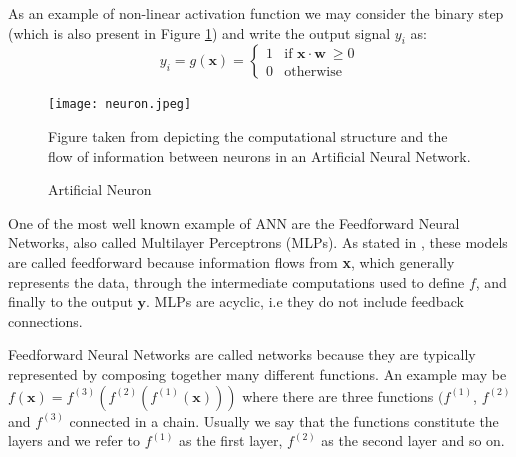 As an example of non-linear activation function we may consider the binary step (which is also present in Figure \ref{fig:neuron}) and write the output signal \(y_i\) as: 
\begin{equation}
  y_i = g(\textbf{x}) =
    \begin{cases}
      1 
      & \text{if } \textbf{x}
      \cdot
      \textbf{w}
       \: \geq 0 \\
      0 
      & \text{otherwise}
    \end{cases}
\end{equation}

\begin{figure}[htp] 
\centering
\texttt{[image: neuron.jpeg]}
\caption{Artificial Neuron}
Figure taken from \cite{neuron} depicting the computational structure and the flow of information between neurons in an Artificial Neural Network.
\label{fig:neuron}
\end{figure}

One of the most well known example of ANN are the Feedforward Neural Networks, also called Multilayer Perceptrons (MLPs). As stated in \cite{Goodfellow-et-al-2016}, these models are called feedforward because information flows from \textbf{x}, which generally represents the data, through the intermediate computations used to define \(f\), and finally to the output \(\textbf{y}\). MLPs are acyclic, i.e they do not include feedback connections.

Feedforward Neural Networks are called networks because they are typically represented by composing together many different functions. An example may be $f(\textbf{x}) = f^{(3)}
(f^{(2)}(f^{(1)}(\textbf{x}))) $ where there are three functions $(f^{(1)}$, $f^{(2)}$ and  $f^{(3)}$ connected in a chain. Usually we say that the functions constitute the layers and we refer to $f^{(1)}$ as the first layer, $f^{(2)}$ as the second layer and so on. 

